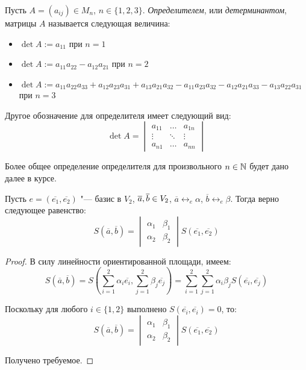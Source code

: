 \begin{definition}
	Пусть $A = (a_{ij}) \in M_{n}$, $n \in \{1, 2, 3\}$. \textit{Определителем}, или \textit{детерминантом}, матрицы $A$ называется следующая величина:
	\begin{itemize}
		\item $\det{A} := a_{11}$ при $n = 1$
		\item $\det{A} := a_{11}a_{22} - a_{12}a_{21}$ при $n = 2$
		\item $\det{A} := a_{11}a_{22}a_{33} + a_{12}a_{23}a_{31} + a_{13}a_{21}a_{32} - a_{11}a_{23}a_{32} - a_{12}a_{21}a_{33} - a_{13}a_{22}a_{31}$ при $n = 3$
	\end{itemize}

	Другое обозначение для определителя имеет следующий вид:
	\[\det{A} = \begin{vmatrix}
		a_{11} & \dots & a_{1n}
		\\
		\vdots & \ddots & \vdots
		\\
		a_{n1} & \dots & a_{nn}
	\end{vmatrix}\]
\end{definition}

\begin{note}
	Более общее определение определителя для произвольного $n \in \mathbb{N}$ будет дано далее в курсе.
\end{note}

\begin{theorem}
	Пусть $e = (\overline{e_1}, \overline{e_2})$ "--- базис в $V_2$, $\overline{a}, \overline{b} \hm{\in} V_2$, $\overline{a} \leftrightarrow_{e} \alpha$, $\overline{b} \leftrightarrow_{e} \beta$. Тогда верно следующее равенство:
	\[S(\overline{a}, \overline{b}) = \begin{vmatrix}
	\alpha_1 & \beta_1\\
	\alpha_2 & \beta_2
	\end{vmatrix}S(\overline{e_1}, \overline{e_2})\]
\end{theorem}

\begin{proof}
	В силу линейности ориентированной площади, имеем:
	\[S(\overline{a}, \overline{b}) = S\left(\sum_{i = 1}^{2} \alpha_i\overline{e_i}, \sum_{j = 1}^{2} \beta_j\overline{e_j}\right) = \sum_{i = 1}^{2} \sum_{j = 1}^{2}\alpha_i\beta_jS(\overline{e_i}, \overline{e_j})\]
	
	Поскольку для любого $i \in \{1, 2\}$ выполнено $S(\overline{e_i}, \overline{e_i}) = 0$, то:
	\[S(\overline{a}, \overline{b}) = \begin{vmatrix}
	\alpha_1 & \beta_1\\
	\alpha_2 & \beta_2
	\end{vmatrix}S(\overline{e_1}, \overline{e_2})\]
	
	Получено требуемое.
\end{proof}


